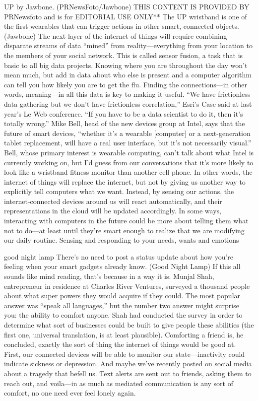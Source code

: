 UP by Jawbone.  (PRNewsFoto/Jawbone) THIS CONTENT IS PROVIDED BY PRNewsfoto and is for EDITORIAL USE ONLY**
The UP wristband is one of the first wearables that can trigger actions in other smart, connected objects. (Jawbone)
The next layer of the internet of things will require combining disparate streams of data “mined” from reality—everything from your location to the members of your social network. This is called sensor fusion, a task that is basic to all big data projects. Knowing where you are throughout the day won’t mean much, but add in data about who else is present and a computer algorithm can tell you how likely you are to get the flu. Finding the connections—in other words, meaning—in all this data is key to making it useful. “We have frictionless data gathering but we don’t have frictionless correlation,” Esri’s Case said at last year’s Le Web conference. “If you have to be a data scientist to do it, then it’s totally wrong.”
Mike Bell, head of the new devices group at Intel, says that the future of smart devices, “whether it’s a wearable [computer] or a next-generation tablet replacement, will have a real user interface, but it’s not necessarily visual.” Bell, whose primary interest is wearable computing, can’t talk about what Intel is currently working on, but I’d guess from our conversations that it’s more likely to look like a wristband fitness monitor than another cell phone.
In other words, the internet of things will replace the internet, but not by giving us another way to explicitly tell computers what we want. Instead, by sensing our actions, the internet-connected devices around us will react automatically, and their representations in the cloud will be updated accordingly. In some ways, interacting with computers in the future could be more about telling them what not to do—at least until they’re smart enough to realize that we are modifying our daily routine.
Sensing and responding to your needs, wants and emotions

good night lamp
There’s no need to post a status update about how you’re feeling when your smart gadgets already know. (Good Night Lamp)
If this all sounds like mind reading, that’s because in a way it is. Munjal Shah, entrepreneur in residence at Charles River Ventures, surveyed a thousand people about what super powers they would acquire if they could. The most popular answer was “speak all languages,” but the number two answer might surprise you: the ability to comfort anyone. Shah had conducted the survey in order to determine what sort of businesses could be built to give people these abilities (the first one, universal translation, is at least plausible). Comforting a friend is, he concluded, exactly the sort of thing the internet of things would be good at. First, our connected devices will be able to monitor our state—inactivity could indicate sickness or depression. And maybe we’ve recently posted on social media about a tragedy that befell us. Text alerts are sent out to friends, asking them to reach out, and voila—in as much as mediated communication is any sort of comfort, no one need ever feel lonely again.



